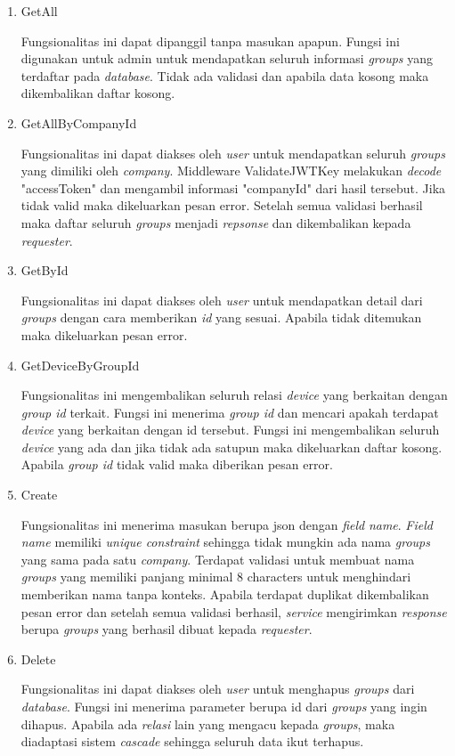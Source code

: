 \pagebreak

\begin{enumerate}
    \item GetAll

          Fungsionalitas ini dapat dipanggil tanpa masukan apapun. Fungsi ini digunakan untuk admin untuk mendapatkan seluruh informasi \textit{groups} yang terdaftar pada \textit{database}. Tidak ada validasi dan apabila data kosong maka dikembalikan daftar kosong.

    \item GetAllByCompanyId

          Fungsionalitas ini dapat diakses oleh \textit{user} untuk mendapatkan seluruh \textit{groups} yang dimiliki oleh \textit{company}. Middleware ValidateJWTKey  melakukan \textit{decode} "accessToken" dan mengambil informasi "companyId" dari hasil tersebut. Jika tidak valid maka dikeluarkan pesan error. Setelah semua validasi berhasil maka daftar seluruh \textit{groups} menjadi \textit{repsonse} dan dikembalikan kepada \textit{requester}.

    \item GetById

          Fungsionalitas ini dapat diakses oleh \textit{user} untuk mendapatkan detail dari \textit{groups} dengan cara memberikan \textit{id} yang sesuai. Apabila tidak ditemukan maka dikeluarkan pesan error.

    \item GetDeviceByGroupId


          Fungsionalitas ini mengembalikan seluruh relasi \textit{device} yang berkaitan dengan \textit{group id} terkait. Fungsi ini menerima \textit{group id} dan mencari apakah terdapat \textit{device} yang berkaitan dengan id tersebut. Fungsi ini mengembalikan seluruh \textit{device} yang ada dan jika tidak ada satupun maka dikeluarkan daftar kosong. Apabila \textit{group id} tidak valid maka diberikan pesan error.

    \item Create

          Fungsionalitas ini menerima masukan berupa json dengan \textit{field} \textit{name}. \textit{Field name} memiliki \textit{unique constraint} sehingga tidak mungkin ada nama \textit{groups} yang sama pada satu \textit{company}. Terdapat validasi untuk membuat nama \textit{groups} yang memiliki panjang minimal 8 characters untuk menghindari memberikan nama tanpa konteks. Apabila terdapat duplikat dikembalikan pesan error dan setelah semua validasi berhasil, \textit{service} mengirimkan \textit{response} berupa \textit{groups} yang berhasil dibuat kepada \textit{requester}.

    \item Delete

          Fungsionalitas ini dapat diakses oleh \textit{user} untuk menghapus \textit{groups} dari \textit{database}. Fungsi ini menerima parameter berupa id dari \textit{groups} yang ingin dihapus. Apabila ada \textit{relasi} lain yang mengacu kepada \textit{groups}, maka diadaptasi sistem \textit{cascade} sehingga seluruh data ikut terhapus.

\end{enumerate}



